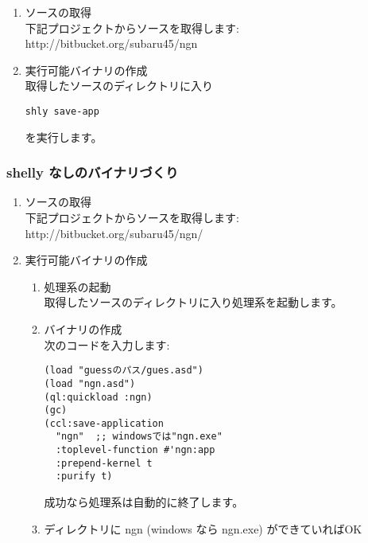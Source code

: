 \documentclass[a4j]{jsarticle}
\begin{document}
\begin{enumerate}
  \item ソースの取得 \\
    下記プロジェクトからソースを取得します: \\
    http://bitbucket.org/subaru45/ngn \\

  \item 実行可能バイナリの作成 \\
    取得したソースのディレクトリに入り
\begin{lstlisting}
shly save-app
\end{lstlisting}
を実行します。
\end{enumerate}

\subsubsection{shelly なしのバイナリづくり}
\begin{enumerate}
  \item ソースの取得 \\
    下記プロジェクトからソースを取得します: \\
    http://bitbucket.org/subaru45/ngn/ \\

  \item 実行可能バイナリの作成

  \begin{enumerate}
    \item 処理系の起動 \\
      取得したソースのディレクトリに入り処理系を起動します。

    \item バイナリの作成 \\
      次のコードを入力します:
      \begin{lstlisting}
(load "guessのパス/gues.asd")
(load "ngn.asd")
(ql:quickload :ngn)
(gc)
(ccl:save-application
  "ngn"  ;; windowsでは"ngn.exe"
  :toplevel-function #'ngn:app
  :prepend-kernel t
  :purify t)
      \end{lstlisting}
      
      成功なら処理系は自動的に終了します。

    \item ディレクトリに ngn (windows なら ngn.exe) ができていればOK

  \end{enumerate}
\end{enumerate}
\end{document}
